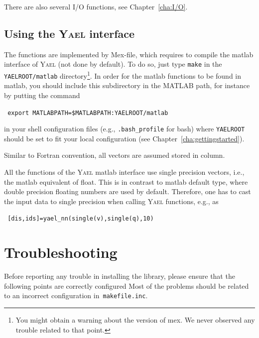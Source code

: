 \documentclass[a4paper,11pt,notitlepage,final,twoside]{report}
\newcommand{\yael}{\textsc{Yael}\xspace}
\newcommand{\yroot}{\texttt{YAELROOT}\xspace}
\newcommand{\tc}[1]{\texttt{#1}}
\newcommand{\code}[1]{\smallskip 

\texttt{#1} 
 \medskip

}
\begin{document}
There are also several I/O functions, see Chapter~\ref{cha:I/O}. 

\section{Using the \yael interface}

The functions are implemented by Mex-file, 
which requires to compile the matlab interface of \yael 
(not done by default). To do so, just type \tc{make}
in the \tc{\yroot/matlab} directory\footnote{You might 
obtain a warning about the version of mex. We never observed 
any trouble related to that point. }. 
In order for the matlab functions to be found in matlab, 
you should include this subdirectory in the MATLAB path, for 
instance by putting the command 

\code{
export MATLABPATH=\$MATLABPATH:\yroot/matlab
}

in your shell configuration files (e.g., \tc{.bash\_profile} for bash) 
where \yroot should be set to fit your local configuration 
(see Chapter~\ref{cha:gettingstarted}). 
\bigskip

Similar to Fortran convention, all vectors are assumed stored in column. 
\bigskip

All the functions of the \yael matlab interface use 
single precision vectors, i.e., the matlab 
equivalent of float. This is in contrast to matlab default type, 
where double precision floating numbers are used by default. 
Therefore, one has to cast the input data to single precision 
when calling \yael functions, e.g., as 

\code{
[dis,ids]=yael\_nn(single(v),single(q),10)
}

\chapter{Troubleshooting}

Before reporting any trouble in installing the library, please
ensure that the following points are correctly configured 
Most of the problems should be related to an incorrect configuration 
in~\tc{makefile.inc}. 
\end{document}
